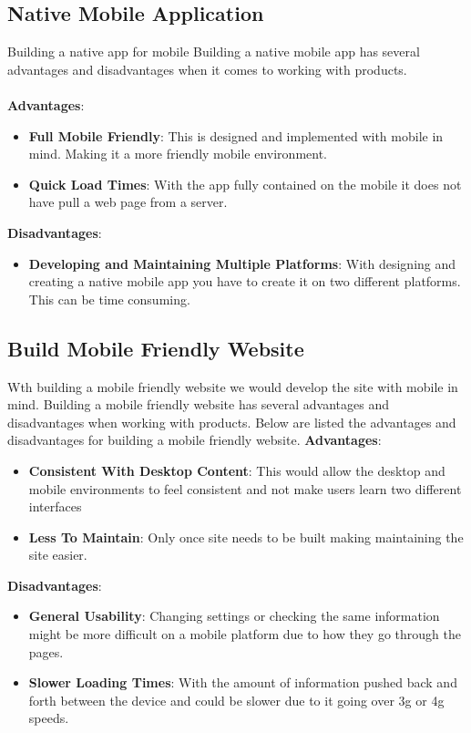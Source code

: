 \documentclass[onecolumn, draftclsnofoot,10pt, compsoc]{IEEEtran}
\begin{document}
		\subsection{Native Mobile Application}
		Building a native app for mobile  Building a native mobile
		app has several advantages and disadvantages when it comes to working with
		products.
		\\\\
		\textbf{Advantages}:
		\begin{itemize}
			\item \textbf{Full Mobile Friendly}: This is designed and implemented with
			mobile in mind. Making it a more friendly mobile environment.
			\item \textbf{Quick Load Times}: With the app fully contained on the mobile
			it does not have pull a web page from a server.
		\end{itemize}
		\noindent\textbf{Disadvantages}:
		\begin{itemize}
			\item \textbf{Developing and Maintaining Multiple Platforms}: With designing
			and creating a native mobile app you have to create it on two different platforms.
			This can be time consuming.
		\end{itemize}
		\subsection{Build Mobile Friendly Website}
		Wth building a mobile friendly website we would develop the site with mobile
		in mind. Building a mobile friendly website has several advantages and disadvantages
		when working with products. Below are listed the advantages and disadvantages
		for building a mobile friendly website.
		\textbf{Advantages}:
		\begin{itemize}
			\item \textbf{Consistent With Desktop Content}: This would allow the desktop
			and mobile environments to feel consistent and not make users learn two
			different interfaces
			\item \textbf{Less To Maintain}: Only once site needs to be built making
			maintaining the site easier.
		\end{itemize}
		\textbf{Disadvantages}:
		\begin{itemize}
			\item \textbf{General Usability}: Changing settings or checking the same
			information might be more difficult on a mobile platform due to how they go
			through the pages.
			\item \textbf{Slower Loading Times}: With the amount of information pushed
			 back and forth between the device and could be slower due to it going over
			 3g or 4g speeds.
		\end{itemize}
\end{document}
